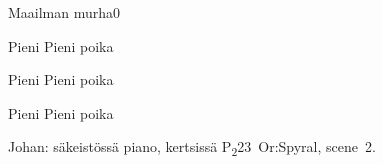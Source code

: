 \documentclass[12pt,a4paper]{article}
\begin{document}
\begin{mysong}{Maailman murha}{0}
\begin{SBChorus}
Pieni     Pieni poika
  
\end{SBChorus}

\begin{SBVerse*}
\end{SBVerse*}

\begin{SBChorus}
Pieni     Pieni poika
  
\end{SBChorus}

\begin{SBVerse*}
    
 
\end{SBVerse*}

\begin{SBChorus}
Pieni     Pieni poika
  
\end{SBChorus}


{\SBLyricNoteFont Johan: säkeistössä piano, kertsissä
P\textsubscript{2}23~Or:Spyral, scene~2.}

\end{mysong}
\end{document}
